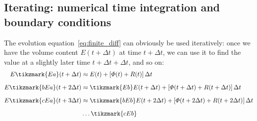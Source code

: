 \documentclass[a4paper,12pt,%
onecolumn,oneside,titlepage,%
british%
]{memoir}
\newcommand*{\incr}{\Delta}%
\renewcommand*{\|}[1][]{\nonscript\:#1\vert\nonscript\:\mathopen{}}
\newcommand*{\yE}{E}
\newcommand*{\yH}{\varPhi}%
\newcommand*{\yR}{R}%
\newcommand*{\Dt}{\incr t}
\begin{document}
\medskip

\subsection{Iterating: numerical time integration and boundary conditions}
\label{sec:timestep_iterate}

The evolution equation~\eqref{eq:finite_diff} can obviously be used iteratively:
once we have the volume content $\yE(t+\Dt)$ at time $t+\Dt$, we can use it to find the value at a slightly later time $t+\Dt+\Dt$, and so on:
\begin{equation}\label{eq:timestepped_evolution}
  \begin{aligned}
   \yE\tikzmark{Ea}(t+\Dt) &\approx
    \yE(t) + [\yH(t) + \yR(t)]\,\Dt
    \\[2\jot]
    \yE\tikzmark{bEa}(t+2\Dt)  &\approx
    \tikzmark{Eb}\yE(t+\Dt) + [\yH(t+\Dt) + \yR(t+\Dt)]\,\Dt
    \\[2\jot]
    \yE\tikzmark{cEa}(t+3\Dt)  &\approx
    \tikzmark{bEb}\yE(t+2\Dt) + [\yH(t+2\Dt) + \yR(t+2\Dt)]\,\Dt
    \\[2\jot]
    &\dotso\tikzmark{cEb}
  \end{aligned}
\end{equation}
\end{document}
